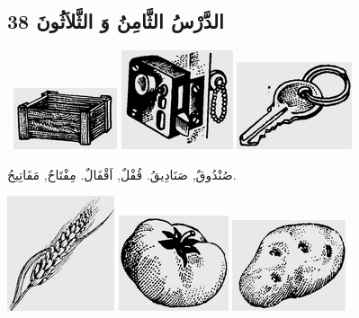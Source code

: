 \documentclass[a5paper]{article}
\begin{document}
\subsection{الدَّرْسُ الثَّامِنُ وَ الثَّلاَثُونَ 38}
\  \includegraphics[width=1.198in,height=0.7083in]{images/MuhammadBagauddinprettified-img096.png}   \includegraphics[width=1.2917in,height=1.1457in]{images/MuhammadBagauddinprettified-img097.png}   \includegraphics[width=1.3335in,height=1.0102in]{images/MuhammadBagauddinprettified-img098.png} 

صُنْدُوقٌ, صَنَادِيقُ. قُفْلٌ, اَقْفَالٌ. مِفْتَاحٌ, مَفَاتِيحُ. 

 \includegraphics[width=1.2398in,height=1.3335in]{images/MuhammadBagauddinprettified-img099.png}   \includegraphics[width=1.2709in,height=1.1043in]{images/MuhammadBagauddinprettified-img100.png}   \includegraphics[width=1.3126in,height=1.052in]{images/MuhammadBagauddinprettified-img101.png} 
\end{document}

